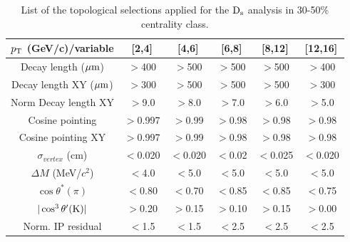 \begin{table}[!h]
 \begin{center}
  \begin{tabular}{|c|c|c|c|c|c|}
\hline
$p_{\rm T}$ (GeV/c)/variable & [2,4] & [4,6] & [6,8] & [8,12] & [12,16] \\
\hline
\hline
Decay length ($\mathrm{\mu m}$)        & $>$400 & $>$500 & $>$500 & $>$500 & $>$400\\
\hline
Decay length XY ($\mathrm{\mu m}$)     & $>$300 & $>$500 & $>$500 & $>$500 & $>$300\\
\hline
Norm Decay length XY          & $>$9.0& $>$8.0 & $>$7.0 & $>$6.0 & $>$5.0\\
\hline
Cosine pointing              & $>$0.997 & $>$0.99 & $>$0.98 & $>$0.98 & $>$0.98\\
\hline
Cosine pointing XY        & $>$0.997 & $>$0.99 & $>$0.98 & $>$0.98 & $>$0.98\\
\hline
$\sigma_{vertex}$  (cm)          & $<$0.020 & $<$0.020 & $<$0.02 & $<$0.025 & $<$0.020\\
\hline
$\Delta M$ (MeV/$c^{2}$) & $<$4.0 & $<$5.0 & $<$5.0 & $<$5.0 & $<$5.0\\
\hline
$\cos \theta^*(\pi)$    & $<$0.80 & $<$0.70 & $<$0.85 & $<$0.85 & $<$0.75\\
\hline
$|\cos^3 \theta^\prime({\rm K})|$        & $>$0.20 & $>$0.15 & $>$0.10 & $>$0.15 & $>$0.00\\
\hline
Norm. IP residual   & $<$1.5 & $<$1.5 & $<$2.5 & $<$2.5 & $<$2.5 \\
\hline
  \end{tabular}
 \caption{List of the topological selections applied for the
   ${\rm D_s}$ analysis in 30-50\% centrality class.}
 \label{tab:topologicalselections_ds_3050}
 \end{center}
\end{table} 

